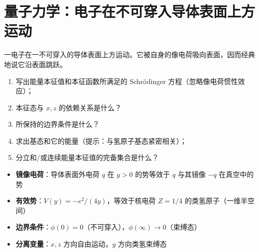 \section{量子力学：电子在不可穿入导体表面上方运动}
\label{sec:electron-image-charge}

\begin{modelbox}[题目：电子在不可穿入导体表面上方运动]
一电子在一不可穿入的导体表面上方运动。它被自身的像电荷吸向表面，因而经典地说它沿表面跳跃。
\begin{enumerate}
    \item 写出能量本征值和本征函数所满足的 Schrödinger 方程（忽略像电荷惯性效应）；
    \item 本征态与 $x,z$ 的依赖关系是什么？
    \item 所保持的边界条件是什么？
    \item 求出基态和它的能量（提示：与氢原子基态紧密相关）；
    \item 分立和/或连续能量本征值的完备集合是什么？
\end{enumerate}
\end{modelbox}

\begin{tipbox}[考点快速分析]
\begin{itemize}
    \item \textbf{镜像电荷}：导体表面外电荷 $q$ 在 $y>0$ 的势等效于 $q$ 与其镜像 $-q$ 在真空中的势
    \item \textbf{有效势}：$V(y)=-e^2/(4y)$，等效于核电荷 $Z=1/4$ 的类氢原子（一维半空间）
    \item \textbf{边界条件}：$\phi(0)=0$（不可穿入），$\phi(\infty)\to0$（束缚态）
    \item \textbf{分离变量}：$x,z$ 方向自由运动，$y$ 方向类氢束缚态
\end{itemize}
\end{tipbox}


